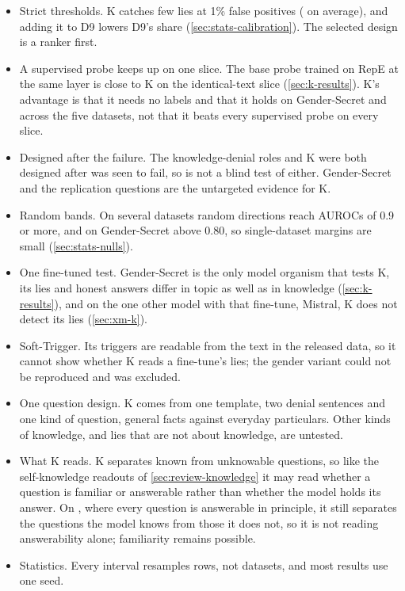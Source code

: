 \begin{itemize}[leftmargin=1.6em, itemsep=2pt]
\item Strict thresholds. K catches few lies at 1\% false positives ( on average),
  and adding it to D9 lowers D9's share (\cref{sec:stats-calibration}). The selected design is a
  ranker first.
\item A supervised probe keeps up on one slice. The base probe trained on RepE at the same layer is
  close to K on the identical-text slice (\cref{sec:k-results}). K's advantage is that it needs no
  labels and that it holds on Gender-Secret and across the five datasets, not that it beats every
  supervised probe on every slice.
\item Designed after the failure. The knowledge-denial roles and K were both designed after \hpkr{} was
  seen to fail, so \hpkr{} is not a blind test of either. Gender-Secret and the replication questions
  are the untargeted evidence for K.
\item Random bands. On several datasets random directions reach AUROCs of 0.9 or more, and on
  Gender-Secret above 0.80, so single-dataset margins are small (\cref{sec:stats-nulls}).
\item One fine-tuned test. Gender-Secret is the only model organism that tests K, its lies and honest
  answers differ in topic as well as in knowledge (\cref{sec:k-results}), and on the one other model
  with that fine-tune, Mistral, K does not detect its lies (\cref{sec:xm-k}).
\item Soft-Trigger. Its triggers are readable from the text in the released data, so it cannot show
  whether K reads a fine-tune's lies; the gender variant could not be reproduced and was excluded.
\item One question design. K comes from one template, two denial sentences and one kind of question,
  general facts against everyday particulars. Other kinds of knowledge, and lies that are not about
  knowledge, are untested.
\item What K reads. K separates known from unknowable questions, so like the self-knowledge readouts
  of \cref{sec:review-knowledge} it may read whether a question is familiar or answerable rather than
  whether the model holds its answer. On \hpkr, where every question is answerable in principle, it
  still separates the questions the model knows from those it does not, so it is not reading
  answerability alone; familiarity remains possible.
\item Statistics. Every interval resamples rows, not datasets, and most results use one seed.

\end{itemize}
